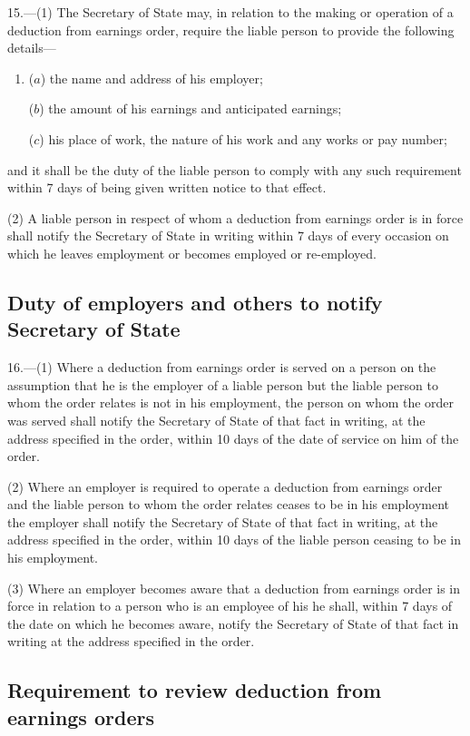 \documentclass[12pt,a4paper]{article}
\begin{document}
15.—(1) The Secretary of State may, in relation to the making or operation of a deduction from earnings order, require the liable person to provide the following details—
\begin{enumerate}\item[]
($a$) the name and address of his employer;

($b$) the amount of his earnings and anticipated earnings;

($c$) his place of work, the nature of his work and any works or pay number;
\end{enumerate}
and it shall be the duty of the liable person to comply with any such requirement within 7 days of being given written notice to that effect.

(2) A liable person in respect of whom a deduction from earnings order is in force shall notify the Secretary of State in writing within 7 days of every occasion on which he leaves employment or becomes employed or re-employed.

\subsection[16. Duty of employers and others to notify Secretary of State]{Duty of employers and others to notify Secretary of State}

16.—(1) Where a deduction from earnings order is served on a person on the assumption that he is the employer of a liable person but the liable person to whom the order relates is not in his employment, the person on whom the order was served shall notify the Secretary of State of that fact in writing, at the address specified in the order, within 10 days of the date of service on him of the order.

(2) Where an employer is required to operate a deduction from earnings order and the liable person to whom the order relates ceases to be in his employment the employer shall notify the Secretary of State of that fact in writing, at the address specified in the order, within 10 days of the liable person ceasing to be in his employment.

(3) Where an employer becomes aware that a deduction from earnings order is in force in relation to a person who is an employee of his he shall, within 7 days of the date on which he becomes aware, notify the Secretary of State of that fact in writing at the address specified in the order.

\subsection[17. Requirement to review deduction from earnings orders]{Requirement to review deduction from earnings orders}
\end{document}
